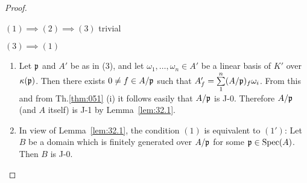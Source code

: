 \documentclass[../main]{subfiles}
\begin{document}
\begin{proof}
\begin{implyenumerate}
    \item[$(1) \implies (2) \implies (3)$] trivial
    \item[$(3) \implies (1)$]
    \begin{enumerate}[label= Step \Roman*.]
        \item Let $\mathfrak{p}$ and $A'$ be as in (3), and let $\omega_1, \ldots, \omega_n \in A'$ be a linear basis of $K'$ over $\kappa(\mathfrak{p})$. Then there exists $0 \ne f \in A/\mathfrak{p}$ such that $A_f' = \sum\limits_1^n (A/\mathfrak{p})_f \omega_i$. From this and from Th.\ref{thm:051} (i) it follows easily that $A/\mathfrak{p}$ is J-0. Therefore $A/\mathfrak{p}$ (and $A$ itself) is J-1 by Lemma~\ref{lem:32.1}. 
        \item In view of Lemma~\ref{lem:32.1}, the condition $(1)$ is equivalent to $(1')$: Let $B$ be a domain which is finitely generated over $A/\mathfrak{p}$ for some $\mathfrak{p} \in \operatorname{Spec}(A)$. Then $B$ is J-0.
\end{enumerate}
\end{implyenumerate}


\end{proof}
\end{document}
